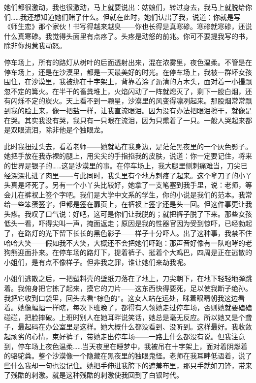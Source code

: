 她们都很激动，我也很激动，马上就要说出：姑娘们，转过身去，我马上就脱给你们……我还想知道她们赌了什么。但就在此时，她们认出了我，说道：你就是写《师生恋》那个家伙！书写得越来越臭——你也长得是真寒碜。寒碜就寒碜，还说什么真寒碜。我觉得头面里有点疼了。头疼是动怒的前兆。你可不要提我写的书，除非你想惹我动怒。 

停车场上，所有的路灯从树叶的后面透射出来，混在浓雾里，夜色温柔。不管是在停车场上，还是在沙漠里，都是一天最美好的时光。在停车场上，我被一群坏女孩围住，在沙漠里，我被绑在十字架上，背靠着涂了沥清的方木头，面对着一小撮飘忽不定的篝火。在半干的畜粪堆上，火焰闪动了一阵就熄灭了，剩下一股白烟，还有闪烁不定的炭火。天上看不到一颗星，沙漠里的风变得凛冽起来。那股烟常常飘到我的脸上来，像一把盐一样，让我直流眼泪。因为没有办法把眼泪擦干，就像是在哭。其实我没有哭，我只有一只眼在流泪，因为只熏着了一只。一般人哭起来都是双眼流泪，除非他是个独眼龙。 

此时我扭过头去，看着老师——她就站在我身边，是茫茫黑夜里的一个灰色影子。她把手放在我赤裸的腿上，用尖尖的手指掐我的皮肤，说道：你一定要记住，将来的世界是银子的……这是沙漠里的事。在停车场上，我大腿里侧刺痛难当，刀尖已经深深扎进了肉里——与此同时，我头里有个地方刺疼了起来。这个拿刀子的小丫头真是坏死了。另有一个小丫头比较好，她拿了一支笔塞到我手里，说：老师，等会儿在裤衩上签个字吧。我们是大学中文系的学生，你的小说是我们的范本。我常给一些笨蛋签字，但都是签在扉页上，在裤衩上签字还是头一回。但这件事更让我头疼。我叹了口气说：好吧，这可是你们让我脱的；就把裤子脱了下来。那些女孩低头一看，吓得尖叫一声，掩面返走；原因是我的性器官因为受到惊吓，已经勃起了，在路灯的光下留下长长的黑色影子——样子十分吓人。出了这种事，我禁不住哈哈大笑——假如我不大笑，大概还不会把她们吓跑：那声音好像有一队咆哮的老狗熊迎面扑来。在停车场的路灯下，提着裤子、挺着个大鸡巴，四周是正在逃散的小姐们，是有点不像样子。但非我之罪，谁让她们来劫我呢。 

小姐们逃散之后，一把塑料壳的壁纸刀落在了地上，刀尖朝下，在地下轻轻地弹跳着。我俯身把它拣了起来，摸它的刀片——这东西快得要死，足以使我断子绝孙。我把它收到口袋里，回头去看“棕色的”。这女人站在远处，眯着眼睛朝我这边看着。她像蝙蝠一样瞎，每次下班晚了，都得有人领她走过停车场，否则她就要磕磕碰碰，把脸摔破。上班时别人在她耳畔说笑话，她总是毫无反应。所以她又是个聋子，最起码在办公室里是这样。她大概什么都没看到、没听到。这样最好。我收敛起顽劣的心情，束好裤子，带她走出停车场——一路上什么都没有说。但我注意到，停车场上夜色温柔……当天夜里在睡梦中，我被吊在十字架上，面对着阴燃着的骆驼粪。整个沙漠像一个隐藏在黑夜里的独眼鬼怪。老师在我耳畔低语着，说了些什么我却一句也没记住。她把手伸进我胯下的遮羞布里，那只手就如刀锋，带来了残酷的刺激。就是这种残酷的刺激使我回到了白银时代。 
